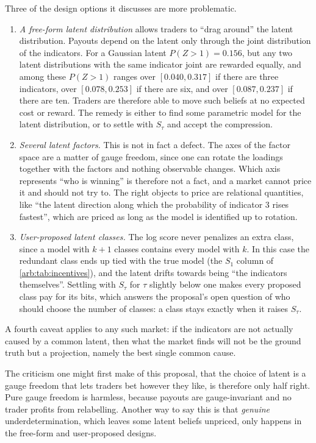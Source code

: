 \begin{draftblock}
Three of the design options it discusses are more problematic.
\begin{enumerate}
\item \emph{A free-form latent distribution} allows traders to ``drag around'' the latent distribution. Payouts depend on the latent only through the joint distribution of the indicators. For a Gaussian latent $P(Z>1)=0.156$, but any two latent distributions with the same indicator joint are rewarded equally, and among these $P(Z>1)$ ranges over $[0.040,0.317]$ if there are three indicators, over $[0.078,0.253]$ if there are six, and over $[0.087,0.237]$ if there are ten. Traders are therefore able to move such beliefs at no expected cost or reward. The remedy is either to find some parametric model for the latent distribution, or to settle with $S_\tau$ and accept the compression.
\item \emph{Several latent factors.} This is not in fact a defect. The axes of the factor space are a matter of gauge freedom, since one can rotate the loadings together with the factors and nothing observable changes. Which axis represents ``who is winning'' is therefore not a fact, and a market cannot price it and should not try to. The right objects to price are relational quantities, like ``the latent direction along which the probability of indicator 3 rises fastest'', which are priced as long as the model is identified up to rotation.
\item \emph{User-proposed latent classes.} The log score never penalizes an extra class, since a model with $k+1$ classes contains every model with $k$. In this case the redundant class ends up tied with the true model (the $S_1$ column of \cref{arb:tab:incentives}), and the latent drifts towards being ``the indicators themselves''. Settling with $S_\tau$ for $\tau$ slightly below one makes every proposed class pay for its bits, which answers the proposal's open question of who should choose the number of classes: a class stays exactly when it raises $S_\tau$.
\end{enumerate}
A fourth caveat applies to any such market: if the indicators are not actually caused by a common latent, then what the market finds will not be the ground truth but a projection, namely the best single common cause.

The criticism one might first make of this proposal, that the choice of latent is a gauge freedom that lets traders bet however they like, is therefore only half right. Pure gauge freedom is harmless, because payouts are gauge-invariant and no trader profits from relabelling. Another way to say this is that \emph{genuine} underdetermination, which leaves some latent beliefs unpriced, only happens in the free-form and user-proposed designs.


\end{draftblock}
